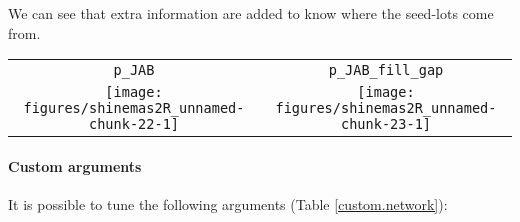 \documentclass{article}\usepackage[]{graphicx}\usepackage[]{color}
\newenvironment{knitrout}{}{} %
\begin{document}
We can see that extra information are added to know where the seed-lots come from.

\begin{center}
\begin{tabular}{cc}
\texttt{p\_JAB} & \texttt{p\_JAB\_fill\_gap} \\
\begin{knitrout}
\definecolor{shadecolor}{rgb}{0.969, 0.969, 0.969}\color{fgcolor}

{\centering \texttt{[image: figures/shinemas2R\_unnamed-chunk-22-1]} 

}



\end{knitrout}
&
\begin{knitrout}
\definecolor{shadecolor}{rgb}{0.969, 0.969, 0.969}\color{fgcolor}

{\centering \texttt{[image: figures/shinemas2R\_unnamed-chunk-23-1]} 

}



\end{knitrout}
\\
\end{tabular}
\end{center}



\paragraph{Custom arguments}

It is possible to tune the following arguments (Table \ref{custom.network}):
\end{document}
